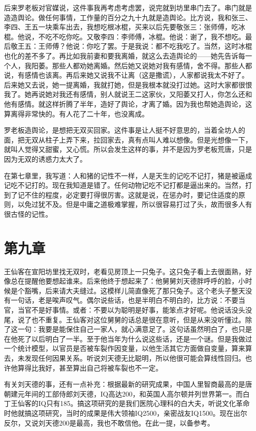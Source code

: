 后来罗老板对官媒说，这件事我再考虑考虑罢，说完就到坊里串门去了。串门就是造造舆论。做任何事情，工作量的百分之九十九就是造舆论。比方说，我和张三、李四、王五一块乘车出去，我想吃根冰棍，买来以后先要敬张三：张师傅，吃冰棍。他说，不吃不吃你吃。又敬李四：李师傅，冰棍。他说：谢了，我不想吃。最后敬王五：王师傅？他说：你吃了罢。于是我说：都不吃我吃了。当然，这时冰棍也化的差不多了。再比如我前妻和要我离婚，就这么去造舆论的——她先告诉每一个人，我阳萎。那些人都劝她离婚。然后她又说她对我有感情，舍不得。那些人都说，有感情也该离。再后来她又说我不让离（这是撒谎），人家都说我太不好了。后来她又去说，她一提离婚，我就打她，但是我根本就没打过她。这时大家都很恨我了。她再说她对我还有感情，别人就说王二这家伙，又阳萎又打人，你怎么还和他有感情。就这样折腾了半年，造好了舆论，才离了婚。因为我也帮她造舆论，这算离得非常快的。有人花了二十年，也没离成。 

罗老板造舆论，是想把无双买回家。这件事是让人挺不好意思的，当着全坊人的面，把无双从柱子上弄下来，拉回家去，真有点叫人难以想像。但是光想像一下，就叫人觉得又甜蜜，又心慌。所以会发生这样的事，并不是因为罗老板荒唐，只是因为无双的诱惑力太大了。 

在第七章里，我写道：人和猪的记性不一样，人是天生的记吃不记打，猪是被逼成记吃不记打的。现在我知道是错了。任何动物记吃不记打都是逼出来的。当然，打到了记不住的程度，必定要打得很厉害。这就是说，在惩办时，要记住适度的原则，以免过犹不及。但是中庸之道极难掌握，所以很容易打过了头，故而很多人有很古怪的记性。

\section{第九章}

王仙客在宣阳坊里找无双时，老看见房顶上一只兔子。这只兔子看上去很面熟，好像总在提醒他要想起谁来。后来他终于想起来了：他舅舅刘天德胖呼呼的脸，小时候是个豁嘴，后来请大夫缝过。这模样儿简直像死了那只兔子。这个老头子整天没有一句话，老是唉声叹气。偶尔说些话，也是半明白不明白的，比方说：不要当官，当官不是好事情。或者：不要以为聪明是好事，能笨点才好呢。他说话没头没尾，说了也不重复。王仙客对这位舅舅的话总是很在意听，但是从来没听懂过。除了这一句：我要是能保住自己一家人，就心满意足了。这句话虽然明白了，也只是在他死了以后明白了一半。至于他当年为什么说这些话，还是一个谜。但是我做过一个统计模型，以官员是否被车裂作因变量，以他生活其它方面做自变量，算来算去，未发现任何因果关系。听说刘天德无比聪明，所以他很可能会算线性回归。也许他算得比我好，甚至算出自己将被车裂也不一定。 

有关刘天德的事，还有一点补充：根据最新的研究成果，中国人里智商最高的是唐朝建元年间的工部侍郎刘天德，IQ高达200，和英国人高尔顿并列世界第一。而白丁王仙客的IQ只有185。搞这项研究的是我们医院心理科的白大夫，听说文化革命时他就搞这项研究，当时的成果是伟大领袖IQ2500，亲密战友IQ1500。现在出尔反尔，又说刘天德200是最高，我也不敢信他。在此一提，以备参考。 

